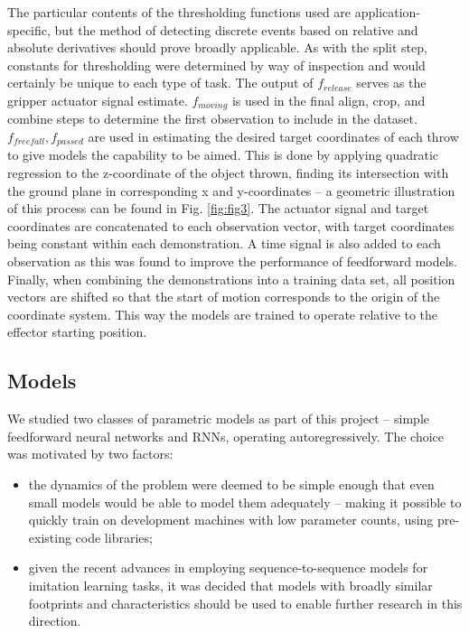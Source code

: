 \documentclass{article}
\begin{document}
The particular contents of the thresholding functions used are application-specific, but the method of detecting discrete events based on relative and absolute derivatives should prove broadly applicable. As with the split step, constants for thresholding were determined by way of inspection and would certainly be unique to each type of task. The output of $f_{release}$ serves as the gripper actuator signal estimate. $f_{moving}$ is used in the final align, crop, and combine steps to determine the first observation to include in the dataset. $f_{freefall}, f_{passed}$ are used in estimating the desired target coordinates of each throw to give models the capability to be aimed. This is done by applying quadratic regression to the z-coordinate of the object thrown, finding its intersection with the ground plane in corresponding x and y-coordinates -- a geometric illustration of this process can be found in Fig. \ref{fig:fig3}. The actuator signal and target coordinates are concatenated to each observation vector, with target coordinates being constant within each demonstration. A time signal is also added to each observation as this was found to improve the performance of feedforward models. Finally, when combining the demonstrations into a training data set, all position vectors are shifted so that the start of motion corresponds to the origin of the coordinate system. This way the models are trained to operate relative to the effector starting position.

\subsection{Models}
\label{sec:models}

We studied two classes of parametric models as part of this project -- simple feedforward neural networks and RNNs, operating autoregressively. The choice was motivated by two factors:
\begin{itemize}
	\item the dynamics of the problem were deemed to be simple enough that even small models would be able to model them adequately -- making it possible to quickly train on development machines with low parameter counts, using pre-existing code libraries;
	\item given the recent advances in employing sequence-to-sequence models for imitation learning tasks, it was decided that models with broadly similar footprints and characteristics should be used to enable further research in this direction.
\end{itemize}
\end{document}
